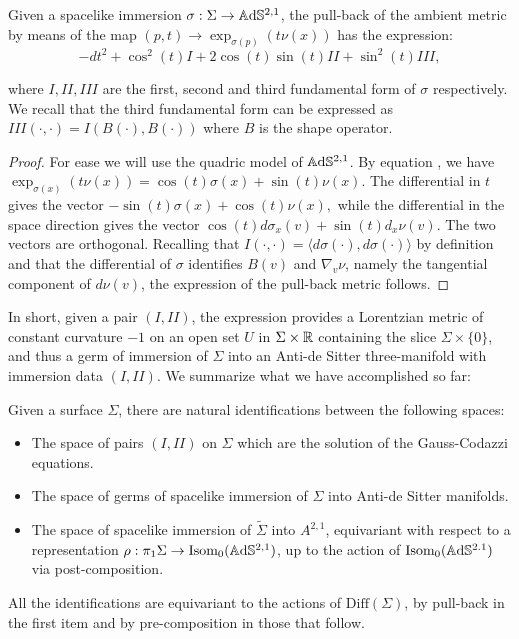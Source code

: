 \begin{lemma}
    Given a spacelike immersion $\sigma:\Sigma\to\mathbb{A}\mathrm{d}\mathbb{S}^{2,1}$, the pull-back of the ambient metric by means of the map $(p,t)\to\exp_{\sigma(p)}(t\nu(x))$ has the expression: 
\begin{equation}\label{64}
    -dt^{2}+\cos^2(t)I+2\cos(t)\sin(t)II+\sin^2(t)III, 
\end{equation}

where $I,II,III$ are the first, second and third fundamental form of $\sigma$ respectively. We recall that the third fundamental form can be expressed as $III(\cdot,\cdot)=I(B(\cdot),B(\cdot))$ where $B$ is the shape operator.
\end{lemma}
\begin{proof}
    For ease we will use the quadric model of $\mathbb{A}\mathrm{d}\mathbb{S}^{2,1}$. By equation , we have $\exp_{\sigma(x)}(t\nu(x))=\cos(t)\sigma(x)+\sin(t)\nu(x)$. The differential in $t$ gives the vector $-\sin(t)\sigma(x)+\cos(t)\nu(x),$ while the differential in the space direction gives the vector $\cos(t)d\sigma_x(v)+\sin(t)d_x\nu(v)$. The two vectors are orthogonal. Recalling that $I(\cdot,\cdot)=\langle d\sigma(\cdot),d\sigma(\cdot)\rangle$ by definition and that the differential of $\sigma$ identifies $B(v)$ and $\nabla_v\nu$, namely the tangential component of $d\nu(v)$, the expression of the pull-back metric follows. 
\end{proof}

In short, given a pair $(I,II)$, the expression  provides a Lorentzian metric of constant curvature $-1$ on an open set $U$ in $\Sigma\times\mathbb{R}$ containing the slice $\Sigma\times\{0\}$, and thus a germ of immersion of $\Sigma$ into an Anti-de Sitter three-manifold with immersion data $(I,II)$. We summarize what we have accomplished so far: 

\begin{proposition}\label{623}
    Given a surface $\Sigma$, there are natural identifications between the following spaces:
    \begin{itemize}
        \item The space of pairs $(I,II)$ on $\Sigma$ which are the solution of the Gauss-Codazzi equations. 
        \item The space of germs of spacelike immersion of $\Sigma$ into Anti-de Sitter manifolds. 
        \item The space of spacelike immersion of $\widetilde{\Sigma}$ into $A^{2,1}$, equivariant with respect to a representation $\rho: \pi_1\Sigma\to \text{Isom}_0(\mathbb{A}\mathrm{d}\mathbb{S}^{2,1})$, up to the action of $\text{Isom}_{0}(\mathbb{A}\mathrm{d}\mathbb{S}^{2.1})$ via post-composition. 
    \end{itemize}
    All the identifications are equivariant to the actions of $\text{Diff}(\Sigma)$, by pull-back in the first item and by pre-composition in those that follow.
\end{proposition}


